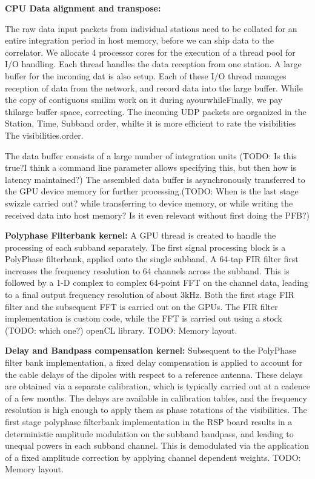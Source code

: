 \documentclass{ws-jai}
\begin{document}
\textbf {CPU  Data alignment  and transpose:}  

The raw data input  packets from individual stations need to  be collated for an
entire  integration period  in  host memory,  before  we can  ship  data to  the
correlator. We allocate 4 processor cores for the execution of a thread pool for
I/O handling. Each  thread handles the data reception from  one station. A large
buffer for  the incoming  dat is also  setup. Each of  these I/O  thread manages
reception of data from the network, and record data into the large buffer. While
the  copy of  contiguous  smilim work  on it  during  ayourwhileFinally, we  pay
thilarge buffer space, correcting. The incoming UDP packets are organized in the
{Station,  Time,  Subband} order,  whilte  it  is  more  efficient to  rate  the
visibilities The visibilities.order.



 The data buffer consists
of a  large number of  integration units (TODO: Is  this true?I think  a command
line parameter allows specifying this, but then how is latency maintained?)  The
assembled data buffer is asynchronously transferred to the GPU device memory for
further  processing.(TODO: When  is the  last stage  swizzle carried  out? while
transferring to  device memory,  or while  writing the  received data  into host
memory? Is it even relevant without first doing the PFB?)

\textbf {Polyphase Filterbank kernel:}
A GPU thread is created to handle the processing of each subband separately. The
first signal processing block is a PolyPhase filterbank, applied onto the single
subband. A  64-tap FIR  filter first  increases the  frequency resolution  to 64
channels  across the  subband.  This  is followed  by a  1-D complex  to complex
64-point FFT on the channel data, leading to a final output frequency resolution
of about 3kHz. Both the first stage FIR filter and the subsequent FFT is carried
out on the GPUs. The FIR filter  implementation is custom code, while the FFT is
carried out using a stock (TODO: which one?) openCL library. TODO: Memory layout.

\textbf {Delay and Bandpass compensation kernel:} 
Subsequent  to  the   PolyPhase  filter  bank  implementation,   a  fixed  delay
compensation is  applied to  account for  the cable delays  of the  dipoles with
respect  to a  reference  antenna.  These  delays are  obtained  via a  separate
calibration, which is  typically carried out at  a cadence of a  few months. The
delays are available in calibration tables, and the frequency resolution is high
enough to  apply them as  phase rotations of  the visibilities. The  first stage
polyphase filterbank implementation in the  RSP board results in a deterministic
amplitude modulation on  the subband bandpass, and leading to  unequal powers in
each  subband channel.  This  is  demodulated via  the  application  of a  fixed
amplitude correction by applying channel dependent weights. TODO: Memory layout.
\end{document}
